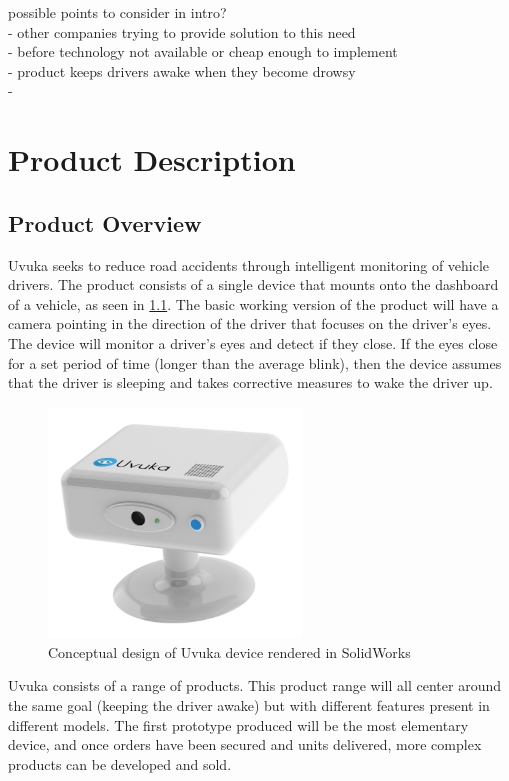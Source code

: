 possible points to consider in intro?\\
- other companies trying to provide solution to this need \\
- before technology not available or cheap enough to implement \\
- product keeps drivers awake when they become drowsy \\
- 

\newpage
\chapter{Product Description}
\section{Product Overview}
Uvuka seeks to reduce road accidents through intelligent monitoring of vehicle drivers. The product consists of a single device that mounts onto the dashboard of a vehicle, as seen in \cref{fig:Uvuka_casing_concept}. The basic working version of the product will have a camera pointing in the direction of the driver that focuses on the driver's eyes. The device will monitor a driver's eyes and detect if they close. If the eyes close for a set period of time (longer than the average blink), then the device assumes that the driver is sleeping and takes corrective measures to wake the driver up.

\begin{figure}[H]
\centering
\includegraphics[width=0.6\textwidth]{images/Uvuka_casing_concept.JPG}
\vskip10pt
\caption{Conceptual design of Uvuka device rendered in SolidWorks}
\label{fig:Uvuka_casing_concept}
\end{figure}

Uvuka consists of a range of products. This product range will all center around the same goal (keeping the driver awake) but with different features present in different models. The first prototype produced will be the most elementary device, and once orders have been secured and units delivered,  more complex products can be developed and sold.

